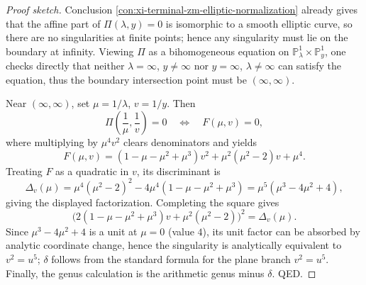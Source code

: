 \begin{proof}[Proof sketch]
Conclusion \ref{con:xi-terminal-zm-elliptic-normalization} already gives that the affine part of \(\Pi(\lambda,y)=0\) is isomorphic to a smooth elliptic curve,
so there are no singularities at finite points; hence any singularity must lie on the boundary at infinity.
Viewing \(\Pi\) as a bihomogeneous equation on \(\mathbb P^1_\lambda\times \mathbb P^1_y\), one checks directly that neither \(\lambda=\infty\), \(y\neq\infty\) nor \(y=\infty\), \(\lambda\neq\infty\) can satisfy the equation,
thus the boundary intersection point must be \((\infty,\infty)\).
\par
Near \((\infty,\infty)\), set \(\mu=1/\lambda\), \(v=1/y\). Then
\[
\Pi\!\left(\frac{1}{\mu},\frac{1}{v}\right)=0
\quad\Longleftrightarrow\quad
F(\mu,v)=0,
\]
where multiplying by \(\mu^4v^2\) clears denominators and yields
\[
F(\mu,v)
=(1-\mu-\mu^2+\mu^3)v^2+\mu^2(\mu^2-2)v+\mu^4.
\]
Treating \(F\) as a quadratic in \(v\), its discriminant is
\[
\Delta_v(\mu)=\mu^4(\mu^2-2)^2-4\mu^4(1-\mu-\mu^2+\mu^3)
=\mu^5(\mu^3-4\mu^2+4),
\]
giving the displayed factorization.
Completing the square gives
\[
\bigl(2(1-\mu-\mu^2+\mu^3)v+\mu^2(\mu^2-2)\bigr)^2=\Delta_v(\mu).
\]
Since \(\mu^3-4\mu^2+4\) is a unit at \(\mu=0\) (value \(4\)), its unit factor can be absorbed by analytic coordinate change,
hence the singularity is analytically equivalent to \(v^2=u^5\); \(\delta\) follows from the standard formula for the plane branch \(v^2=u^5\).
Finally, the genus calculation is the arithmetic genus minus \(\delta\). QED.
\end{proof}


